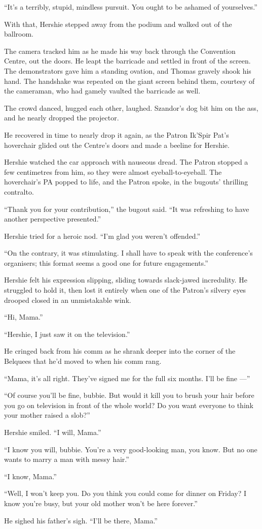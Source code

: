 ``It's a terribly, stupid, mindless pursuit. You ought to be ashamed of 
yourselves.''

With that, Hershie stepped away from the podium and walked out of
the ballroom.

\tb

The camera tracked him as he made his way back through the
Convention Centre, out the doors. He leapt the barricade and
settled in front of the screen. The demonstrators gave him a
standing ovation, and Thomas gravely shook his hand. The handshake
was repeated on the giant screen behind them, courtesy of the
cameraman, who had gamely vaulted the barricade as well.

The crowd danced, hugged each other, laughed. Szandor's dog bit him
on the ass, and he nearly dropped the projector.

He recovered in time to nearly drop it again, as the Patron Ik'Spir
Pat's hoverchair glided out the Centre's doors and made a beeline
for Hershie.

Hershie watched the car approach with nauseous dread. The Patron
stopped a few centimetres from him, so they were almost
eyeball-to-eyeball. The hoverchair's PA popped to life, and the
Patron spoke, in the bugouts' thrilling contralto.

``Thank you for your contribution,'' the bugout said.
``It was refreshing to have another perspective presented.''

Hershie tried for a heroic nod. ``I'm glad you weren't offended.''

``On the contrary, it was stimulating. I shall have to speak with the 
conference's organisers; this format seems a good one for future engagements.''

Hershie felt his expression slipping, sliding towards slack-jawed
incredulity. He struggled to hold it, then lost it entirely when
one of the Patron's silvery eyes drooped closed in an unmistakable
wink.

\tb

``Hi, Mama.''

``Hershie, I just saw it on the television.''

He cringed back from his comm as he shrank deeper into the corner
of the Belquees that he'd moved to when his comm rang.

``Mama, it's all right. They've signed me for the full six months. I'll be fine 
---''

``Of course you'll be fine, bubbie. But would it kill you to brush your hair 
before you go on television in front of the whole world? Do you want everyone 
to think your mother raised a slob?''

Hershie smiled. ``I will, Mama.''

``I know you will, bubbie. You're a very good-looking man, you know. But no one 
wants to marry a man with messy hair.''

``I know, Mama.''

``Well, I won't keep you. Do you think you could come for dinner on Friday? I 
know you're busy, but your old mother won't be here forever.''

He sighed his father's sigh. ``I'll be there, Mama.''


